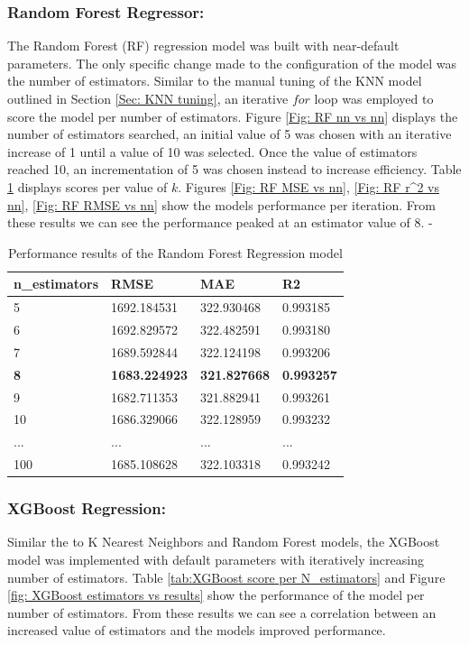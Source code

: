 \subsubsection{Random Forest Regressor:}
The Random Forest (RF) regression model was built with near-default parameters. The only specific change made to the configuration of the model was the number of estimators. Similar to the manual tuning of the KNN model outlined in Section \ref{Sec: KNN tuning}, an iterative $for$ loop was employed to score the model per number of estimators. Figure \ref{Fig: RF nn vs nn} displays the number of estimators searched, an initial value of 5 was chosen with an iterative increase of 1 until a value of 10 was selected. Once the value of estimators reached 10, an incrementation of 5 was chosen instead to increase efficiency. Table \ref{tab: RF score per K} displays scores per value of $k$. Figures \ref{Fig: RF MSE vs nn}, \ref{Fig: RF r^2 vs nn}, \ref{Fig: RF RMSE vs nn} show the models performance per iteration. From these results we can see the performance peaked at an estimator value of 8.
-
\begin{table}[!htbp]
    \centering
    \begin{tabularx}{\textwidth}{XXXX}
    \hline
    n\_estimators & RMSE & MAE & R2 \\
    \hline
    5 & 1692.184531 & 322.930468 & 0.993185 \\
    6 & 1692.829572 & 322.482591 & 0.993180 \\
    7 & 1689.592844 & 322.124198 & 0.993206 \\
    \textbf{8} & \textbf{1683.224923} & \textbf{321.827668} & \textbf{0.993257} \\
    9 & 1682.711353 & 321.882941 & 0.993261 \\
    10 & 1686.329066 & 322.128959 & 0.993232 \\
    ... & ... & ... & ... \\
    100 & 1685.108628 & 322.103318 & 0.993242 \\
    \hline
    \end{tabularx}
    \caption{Performance results of the Random Forest Regression model}
    \label{tab: RF score per K}
\end{table}

\subsubsection{XGBoost Regression:}
Similar the to K Nearest Neighbors and Random Forest models, the XGBoost model was implemented with default parameters with iteratively increasing number of estimators. Table \ref{tab:XGBoost score per N_estimators} and Figure \ref{fig: XGBoost estimators vs results} show the performance of the model per number of estimators. From these results we can see a correlation between an increased value of estimators and the models improved performance.


